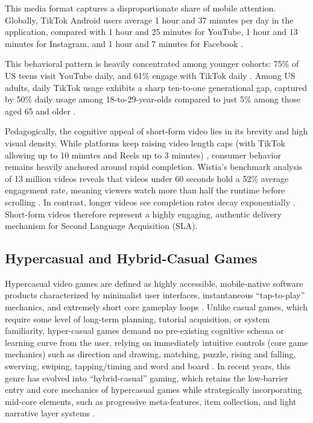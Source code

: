    This media format captures a disproportionate share of mobile attention. Globally, TikTok Android users average 1 hour and 37 minutes per day in the application, compared with 1 hour and 25 minutes for YouTube, 1 hour and 13 minutes for Instagram, and 1 hour and 7 minutes for Facebook \cite{similarweb2025}.
    
    This behavioral pattern is heavily concentrated among younger cohorts: 75\% of US teens visit YouTube daily, and 61\% engage with TikTok daily \cite{pew2025teens}. Among US adults, daily TikTok usage exhibits a sharp ten-to-one generational gap, captured by 50\% daily usage among 18-to-29-year-olds compared to just 5\% among those aged 65 and older \cite{pew2025social}. 

    Pedagogically, the cognitive appeal of short-form video lies in its brevity and high visual density. While platforms keep raising video length caps (with TikTok allowing up to 10 minutes and Reels up to 3 minutes) \cite{postplanify2026}, consumer behavior remains heavily anchored around rapid completion. Wistia's benchmark analysis of 13 million videos reveals that videos under 60 seconds hold a 52\% average engagement rate, meaning viewers watch more than half the runtime before scrolling \cite{wistia2026}. In contrast, longer videos see completion rates decay exponentially \cite{wistia2026, vidyard2024}. Short-form videos therefore represent a highly engaging, authentic delivery mechanism for Second Language Acquisition (SLA).

   \subsection{Hypercasual and Hybrid-Casual Games} \label{sub:hypercasual_and_hybrid_casual_games}

    Hypercasual video games are defined as highly accessible, mobile-native software products characterized by minimalist user interfaces, instantaneous ``tap-to-play'' mechanics, and extremely short core gameplay loops \cite{Zelevskaya2022thesis}. Unlike casual games, which require some level of long-term planning, tutorial acquisition, or system familiarity, hyper-casual games demand no pre-existing cognitive schema or learning curve from the user, relying on immediately intuitive controls (core game mechanics) such as direction and drawing, matching, puzzle, rising and falling, swerving, swiping, tapping/timing and word and board \cite{Zelevskaya2022thesis, pizzo2023hypercasual}. In recent years, this genre has evolved into ``hybrid-casual'' gaming, which retains the low-barrier entry and core mechanics of hypercasual games while strategically incorporating mid-core elements, such as progressive meta-features, item collection, and light narrative layer systems \cite{pizzo2023hypercasual}.

